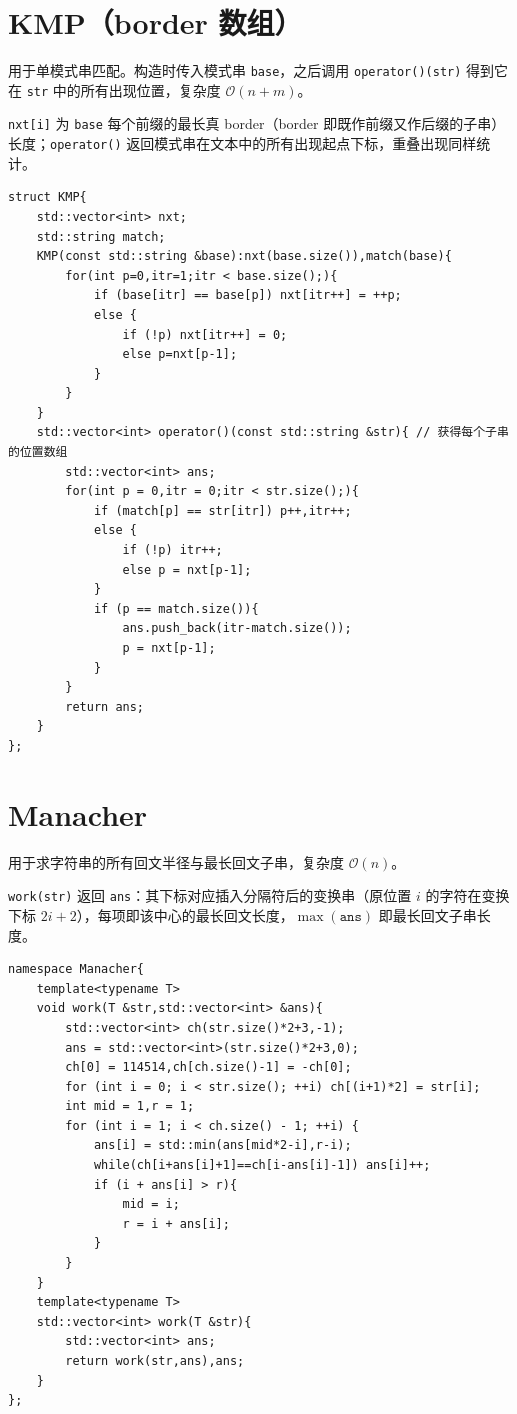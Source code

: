 \section{KMP（border 数组）}

用于单模式串匹配。构造时传入模式串 \texttt{base}，之后调用 \texttt{operator()(str)} 得到它在 \texttt{str} 中的所有出现位置，复杂度 $\mathcal{O}(n+m)$。

\texttt{nxt[i]} 为 \texttt{base} 每个前缀的最长真 border（border 即既作前缀又作后缀的子串）长度；\texttt{operator()} 返回模式串在文本中的所有出现起点下标，重叠出现同样统计。

\begin{lstlisting}
struct KMP{
    std::vector<int> nxt;
    std::string match;
    KMP(const std::string &base):nxt(base.size()),match(base){
        for(int p=0,itr=1;itr < base.size();){
            if (base[itr] == base[p]) nxt[itr++] = ++p;
            else {
                if (!p) nxt[itr++] = 0;
                else p=nxt[p-1];
            }
        }
    }
    std::vector<int> operator()(const std::string &str){ // 获得每个子串的位置数组
        std::vector<int> ans;
        for(int p = 0,itr = 0;itr < str.size();){
            if (match[p] == str[itr]) p++,itr++;
            else {
                if (!p) itr++;
                else p = nxt[p-1];
            }
            if (p == match.size()){
                ans.push_back(itr-match.size());
                p = nxt[p-1];
            }
        }
        return ans;
    }
};
\end{lstlisting}

\section{Manacher}

用于求字符串的所有回文半径与最长回文子串，复杂度 $\mathcal{O}(n)$。

\texttt{work(str)} 返回 \texttt{ans}：其下标对应插入分隔符后的变换串（原位置 $i$ 的字符在变换下标 $2i+2$），每项即该中心的最长回文长度，$\max(\texttt{ans})$ 即最长回文子串长度。

\begin{lstlisting}
namespace Manacher{
    template<typename T>
    void work(T &str,std::vector<int> &ans){
        std::vector<int> ch(str.size()*2+3,-1);
        ans = std::vector<int>(str.size()*2+3,0);
        ch[0] = 114514,ch[ch.size()-1] = -ch[0];
        for (int i = 0; i < str.size(); ++i) ch[(i+1)*2] = str[i];
        int mid = 1,r = 1;
        for (int i = 1; i < ch.size() - 1; ++i) {
            ans[i] = std::min(ans[mid*2-i],r-i);
            while(ch[i+ans[i]+1]==ch[i-ans[i]-1]) ans[i]++;
            if (i + ans[i] > r){
                mid = i;
                r = i + ans[i];
            }
        }
    }
    template<typename T>
    std::vector<int> work(T &str){
        std::vector<int> ans;
        return work(str,ans),ans;
    }
};
\end{lstlisting}

